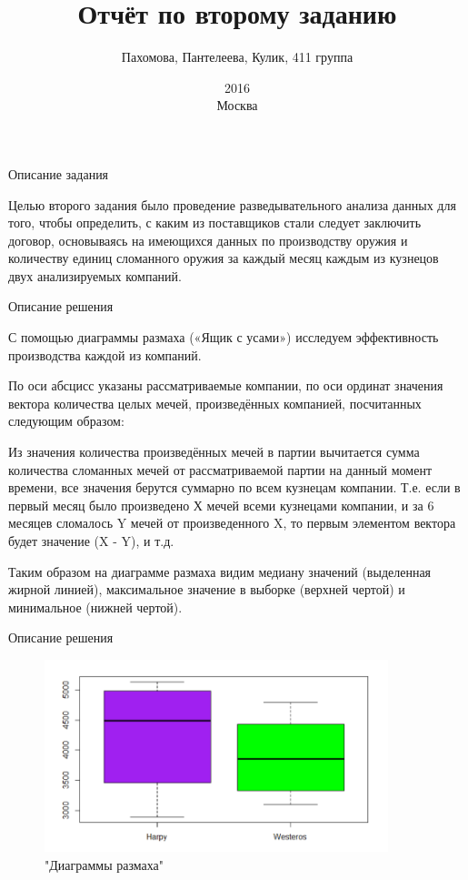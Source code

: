 \documentclass{beamer}
\begin{document}
\title{Отчёт по второму заданию}  
\author{Пахомова, Пантелеева, Кулик, 411 группа}
\date{ 2016\\Москва} 
\thispagestyle{empty}
\frame{\titlepage} 

\begin{frame}{Описание задания}

{\small
Целью второго задания было проведение разведывательного анализа данных для того, чтобы определить, с каким из поставщиков стали следует заключить договор, основываясь на имеющихся данных по производству оружия и количеству единиц сломанного оружия за каждый месяц каждым из кузнецов двух анализируемых компаний. }

\end{frame}

\begin{frame}{Описание решения}

{\footnotesize
С помощью диаграммы размаха («Ящик с усами») исследуем эффективность производства каждой из компаний.

По оси абсцисс указаны рассматриваемые компании, по оси ординат значения вектора количества целых мечей, произведённых компанией, посчитанных следующим образом:

Из значения количества произведённых мечей в партии вычитается сумма количества сломанных мечей от рассматриваемой партии на данный момент времени, все значения берутся суммарно по всем кузнецам компании.
Т.е. если в первый месяц было произведено Х мечей всеми кузнецами компании, и за 6 месяцев сломалось Y мечей от произведенного X, то первым элементом вектора будет значение (X - Y), и т.д.

Таким образом на диаграмме размаха видим медиану значений (выделенная жирной линией), максимальное значение в выборке (верхней чертой) и минимальное (нижней чертой). }

\end{frame}


\begin{frame}{Описание решения}	
	\begin{figure}[h]
		\includegraphics[width=100mm]{Graph}
		\caption{"Диаграммы размаха"}
		\label{Graph}
	\end{figure}
	
\end{frame}
\end{document}
